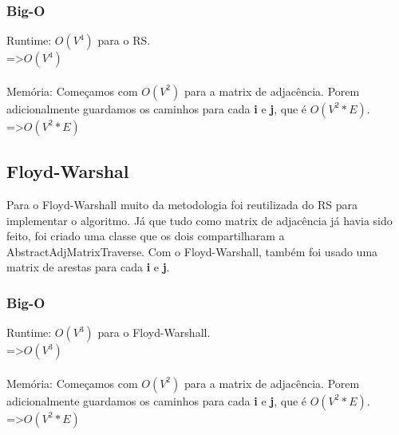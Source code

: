 \documentclass[a4paper,11pt,oneside]{article}
\begin{document}
    \subsubsection{Big-O}
    Runtime: \begin{math} O(V^4) \end{math} para o RS. \\
    =\textgreater \begin{math}O(V^4)\end{math} \\\\
    Mem\'oria: Come\c{c}amos com \begin{math}O(V^2) \end{math} para a matrix de adjac\^encia. Porem adicionalmente guardamos os caminhos para cada \textbf{i} e \textbf{j}, que \'e \begin{math}O(V^2 * E)\end{math}. \\
    =\textgreater \begin{math}O(V^2 * E)\end{math}
    

    \subsection{Floyd-Warshal}
    Para o Floyd-Warshall muito da metodologia foi reutilizada do RS para implementar o algoritmo. J\'a que tudo como matrix de adjac\^encia j\'a havia sido feito, foi criado uma classe que os dois compartilharam a AbstractAdjMatrixTraverse. Com o Floyd-Warshall, tamb\'em foi usado uma matrix de arestas para cada \textbf{i} e \textbf{j}.
    \subsubsection{Big-O}
    Runtime: \begin{math} O(V^3) \end{math} para o Floyd-Warshall. \\
    =\textgreater \begin{math}O(V^3)\end{math} \\\\
    Mem\'oria: Come\c{c}amos com \begin{math}O(V^2) \end{math} para a matrix de adjac\^encia. Porem adicionalmente guardamos os caminhos para cada \textbf{i} e \textbf{j}, que \'e \begin{math}O(V^2 * E)\end{math}. \\
    =\textgreater \begin{math}O(V^2 * E)\end{math}
    
\end{document}
